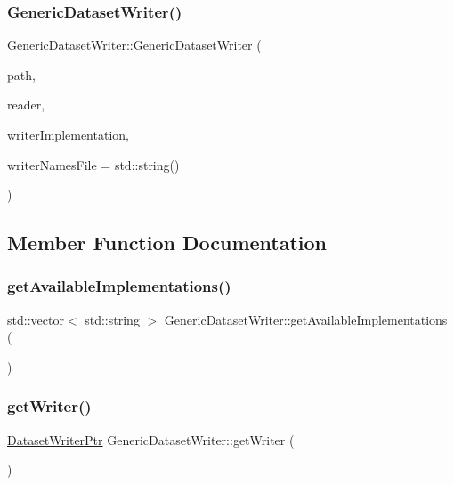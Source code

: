 \subsubsection{\texorpdfstring{Generic\+Dataset\+Writer()}{GenericDatasetWriter()}}
{\footnotesize\ttfamily Generic\+Dataset\+Writer\+::\+Generic\+Dataset\+Writer (\begin{DoxyParamCaption}\item[{const std\+::string \&}]{path,  }\item[{\hyperlink{_dataset_reader_8h_a30d89cba514a220d64d04535c0465f1c}{Dataset\+Reader\+Ptr} \&}]{reader,  }\item[{const std\+::string \&}]{writer\+Implementation,  }\item[{const std\+::string \&}]{writer\+Names\+File = {\ttfamily std\+:\+:string()} }\end{DoxyParamCaption})}



\subsection{Member Function Documentation}
\mbox{\label{class_generic_dataset_writer_ae2728eb07aa990f39d41aa0d2eee2206}} 
\subsubsection{\texorpdfstring{get\+Available\+Implementations()}{getAvailableImplementations()}}
{\footnotesize\ttfamily std\+::vector$<$ std\+::string $>$ Generic\+Dataset\+Writer\+::get\+Available\+Implementations (\begin{DoxyParamCaption}{ }\end{DoxyParamCaption})\hspace{0.3cm}{\ttfamily [static]}}

\mbox{\label{class_generic_dataset_writer_a56eed0c235998128360dfc4fdc347799}} 
\subsubsection{\texorpdfstring{get\+Writer()}{getWriter()}}
{\footnotesize\ttfamily \hyperlink{_dataset_writer_8h_a6d016fa40626aa1798ebce934c5d29b0}{Dataset\+Writer\+Ptr} Generic\+Dataset\+Writer\+::get\+Writer (\begin{DoxyParamCaption}{ }\end{DoxyParamCaption})}



